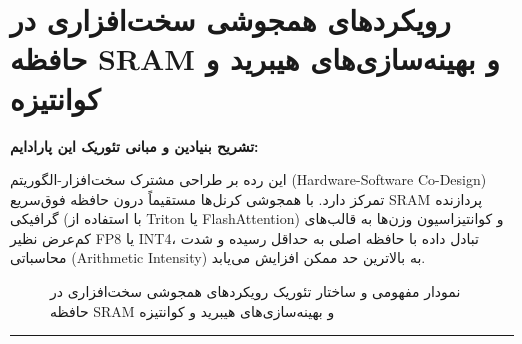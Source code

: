 \section{رویکردهای همجوشی سخت‌افزاری در حافظه SRAM و بهینه‌سازی‌های هیبرید و کوانتیزه}

\textbf{تشریح بنیادین و مبانی تئوریک این پارادایم:}

این رده بر طراحی مشترک سخت‌افزار-الگوریتم (Hardware-Software Co-Design) تمرکز دارد. با همجوشی کرنل‌ها مستقیماً درون حافظه فوق‌سریع SRAM پردازنده گرافیکی (با استفاده از Triton یا FlashAttention) و کوانتیزاسیون وزن‌ها به قالب‌های کم‌عرض نظیر FP8 یا INT4، تبادل داده با حافظه اصلی به حداقل رسیده و شدت محاسباتی (Arithmetic Intensity) به بالاترین حد ممکن افزایش می‌یابد.

\begin{figure}[H]
\centering
{}
\caption{نمودار مفهومی و ساختار تئوریک رویکردهای همجوشی سخت‌افزاری در حافظه SRAM و بهینه‌سازی‌های هیبرید و کوانتیزه}
\end{figure}

\vspace{0.4cm}
\hrule
\vspace{0.4cm}

